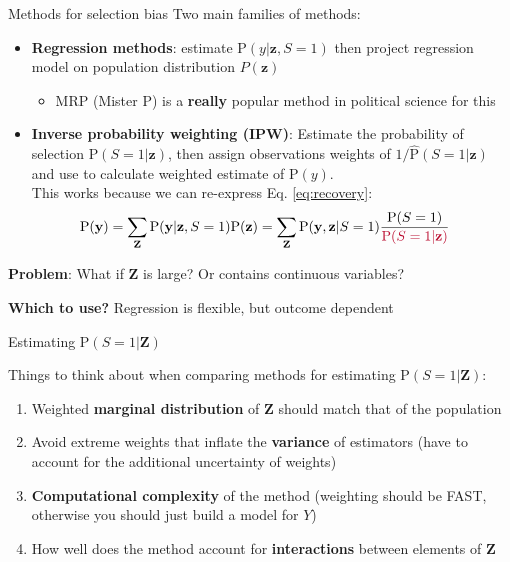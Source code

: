 \documentclass[ignorenonframetext,]{beamer}
\begin{document}
\begin{frame}{Methods for selection bias}
Two main families of methods:
\pause
\begin{itemize}
	\item \textbf{Regression methods}: estimate $\text{P}(y|\mathbf{z}, S=1)$ then project regression model on population distribution $P(\mathbf{z})$\\
	\begin{itemize}
		\item	MRP (Mister P) is a \textbf{really} popular method in political science for this
	\end{itemize}
\pause
	\item \textbf{Inverse probability weighting (IPW)}: Estimate the probability of selection $\text{P}(S = 1 | \mathbf{z})$, then assign observations weights of $1/\hat{\text{P}}(S = 1|\mathbf{z})$ and use to calculate weighted estimate of $\text{P}(y)$.\\
	\pause This works because we can re-express Eq. \ref{eq:recovery}:
	\begin{align} \label{eq:IPSW}
	\text{P}(\mathbf{y}) &= \sum_\mathbf{Z} \text{P}(\mathbf{y}| \mathbf{z}, S=1)\text{P}(\mathbf{z})= \sum_\mathbf{Z} \text{P}(\mathbf{y}, \mathbf{z} | S = 1)\frac{\text{P}(S = 1)} {\textcolor{oxfordred}{\text{P}(S = 1 | \mathbf{z})}}
	\end{align}
\end{itemize}
\pause
\textbf{Problem}: What if $\mathbf{Z}$ is large?  Or contains continuous variables?

\pause
\textbf{Which to use?} Regression is flexible, but outcome dependent
\end{frame}

\begin{frame}{Estimating \(\text{P}(S = 1 | \mathbf{Z})\)}

Things to think about when comparing methods for estimating
\(\text{P}(S = 1 | \mathbf{Z})\):

\begin{enumerate}
	\item Weighted \textbf{marginal distribution} of \(\mathbf{Z}\) should match that of the population
	\item Avoid extreme weights that inflate the \textbf{variance} of estimators (have to account for the additional uncertainty of weights)
	\item \textbf{Computational complexity} of the method (weighting should be FAST, otherwise you should just build a model for $Y$)
	\item How well does the method account for \textbf{interactions} between elements of \(\mathbf{Z}\)
\end{enumerate}

\end{frame}
\end{document}
